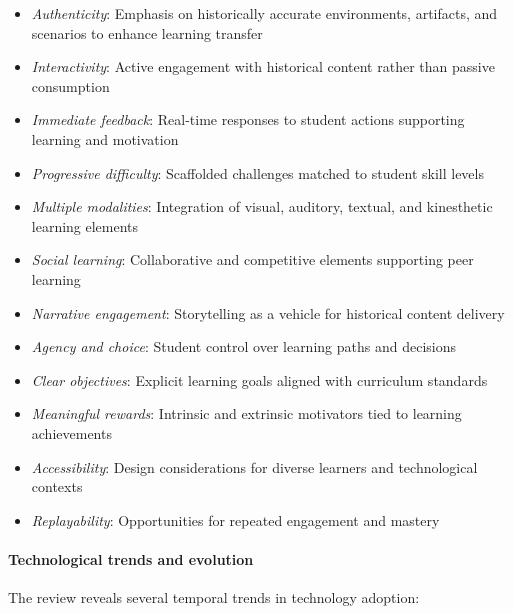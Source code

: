 \documentclass[a4paper,fleqn]{cas-sc}
\begin{document}
\begin{itemize}[noitemsep]
 \item \textit{Authenticity}: Emphasis on historically accurate environments, artifacts, and scenarios to enhance learning transfer
 
 \item \textit{Interactivity}: Active engagement with historical content rather than passive consumption
 
 \item \textit{Immediate feedback}: Real-time responses to student actions supporting learning and motivation
 
 \item \textit{Progressive difficulty}: Scaffolded challenges matched to student skill levels
 
 \item \textit{Multiple modalities}: Integration of visual, auditory, textual, and kinesthetic learning elements
 
 \item \textit{Social learning}: Collaborative and competitive elements supporting peer learning
 
 \item \textit{Narrative engagement}: Storytelling as a vehicle for historical content delivery
 
 \item \textit{Agency and choice}: Student control over learning paths and decisions
 
 \item \textit{Clear objectives}: Explicit learning goals aligned with curriculum standards
 
 \item \textit{Meaningful rewards}: Intrinsic and extrinsic motivators tied to learning achievements
 
 \item \textit{Accessibility}: Design considerations for diverse learners and technological contexts
 
 \item \textit{Replayability}: Opportunities for repeated engagement and mastery
\end{itemize}

\paragraph{Technological trends and evolution}

The review reveals several temporal trends in technology adoption:
\end{document}
